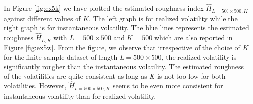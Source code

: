\documentclass{article}
\begin{document}
In Figure \ref{fig:ex5k} we have plotted the estimated roughness index $\widehat{H}_{L=500\times 500,K}$ against different values of $K$. The left graph is for realized volatility while the right graph is for instantaneous volatility. The blue lines represents the estimated roughness $\hat{H}_{L,K}$ with $L=500\times 500$ and $K=500$ which are also reported in Figure \ref{fig:ex5w}. From the figure, we observe that irrespective of the choice of $K$ for the finite sample dataset of length $L=500\times 500$, the realized volatility is significantly rougher than the instantaneous volatility. The estimated roughness of the volatilities are quite consistent as long as $K$ is not too low for both volatilities. However, $\widehat{H}_{L=500\times 500,K}$ seems to be even more consistent for instantaneous volatility than for realized volatility.
\begin{figure}[htbp]
    \centering
    

\end{figure}
\end{document}
